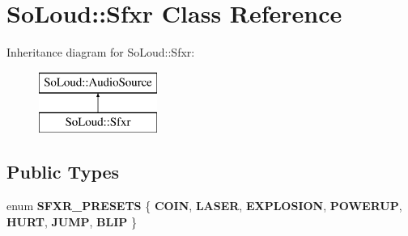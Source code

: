 \hypertarget{class_so_loud_1_1_sfxr}{}\section{So\+Loud\+:\+:Sfxr Class Reference}
\label{class_so_loud_1_1_sfxr}
Inheritance diagram for So\+Loud\+:\+:Sfxr\+:\begin{figure}[H]
\begin{center}
\leavevmode
\includegraphics[height=2.000000cm]{class_so_loud_1_1_sfxr}
\end{center}
\end{figure}
\subsection*{Public Types}
\begin{DoxyCompactItemize}
\item 
\mbox{\label{class_so_loud_1_1_sfxr_afda1c6ce4460589ccb57f2a515ad84fa}} 
enum {\bfseries S\+F\+X\+R\+\_\+\+P\+R\+E\+S\+E\+TS} \{ \newline
{\bfseries C\+O\+IN}, 
{\bfseries L\+A\+S\+ER}, 
{\bfseries E\+X\+P\+L\+O\+S\+I\+ON}, 
{\bfseries P\+O\+W\+E\+R\+UP}, 
\newline
{\bfseries H\+U\+RT}, 
{\bfseries J\+U\+MP}, 
{\bfseries B\+L\+IP}
 \}
\end{DoxyCompactItemize}

